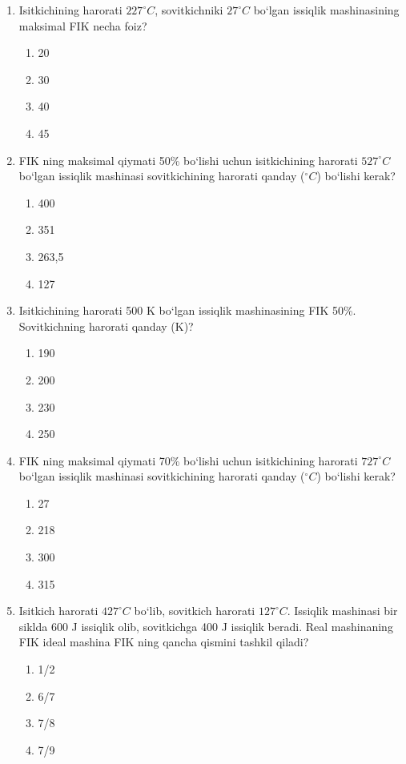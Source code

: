 \begin{enumerate}
\item Isitkichining harorati $227^\circ C$, sovitkichniki $27^\circ C$ bo‘lgan issiqlik mashinasining maksimal FIK necha foiz?
\begin{enumerate}[label=\Alph*)]
\item 20
\item 30
\item 40
\item 45
\end{enumerate}

\item FIK ning maksimal qiymati 50\% bo‘lishi uchun isitkichining harorati $527^\circ C$ bo‘lgan issiqlik mashinasi sovitkichining harorati qanday ($^\circ C$) bo‘lishi kerak?
\begin{enumerate}[label=\Alph*)]
\item 400
\item 351
\item 263,5
\item 127
\end{enumerate}

\item Isitkichining harorati 500 K bo‘lgan issiqlik mashinasining FIK 50\%. Sovitkichning harorati qanday (K)?
\begin{enumerate}[label=\Alph*)]
\item 190
\item 200
\item 230
\item 250
\end{enumerate}

\item FIK ning maksimal qiymati 70\% bo‘lishi uchun isitkichining harorati $727^\circ C$ bo‘lgan issiqlik mashinasi sovitkichining harorati qanday ($^\circ C$) bo‘lishi kerak?
\begin{enumerate}[label=\Alph*)]
\item 27
\item 218
\item 300
\item 315
\end{enumerate}

\item Isitkich harorati $427^\circ C$ bo‘lib, sovitkich harorati $127^\circ C$. Issiqlik mashinasi bir siklda 600 J issiqlik olib, sovitkichga 400 J issiqlik beradi. Real mashinaning FIK ideal mashina FIK ning qancha qismini tashkil qiladi?
\begin{enumerate}[label=\Alph*)]
\item 1/2
\item 6/7
\item 7/8
\item 7/9
\end{enumerate}


\end{enumerate}
